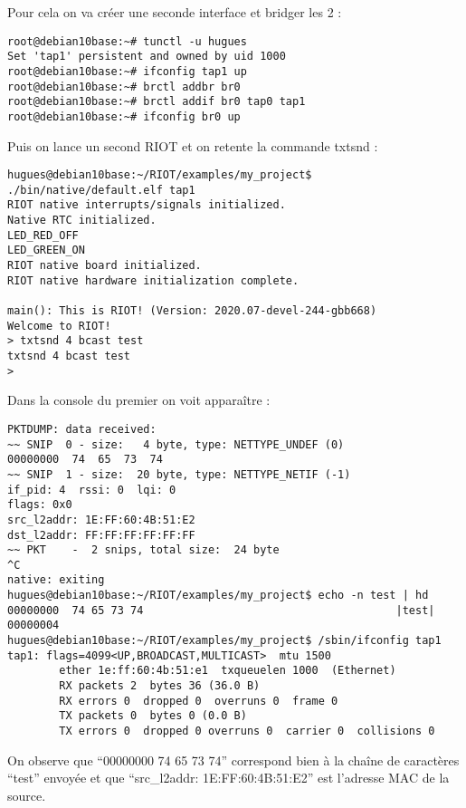 Pour cela on va créer une seconde interface et bridger les 2 :
\begin{verbatim}
root@debian10base:~# tunctl -u hugues
Set 'tap1' persistent and owned by uid 1000
root@debian10base:~# ifconfig tap1 up
root@debian10base:~# brctl addbr br0
root@debian10base:~# brctl addif br0 tap0 tap1
root@debian10base:~# ifconfig br0 up
\end{verbatim}
Puis on lance un second RIOT et on retente la commande txtsnd :
\begin{verbatim}
hugues@debian10base:~/RIOT/examples/my_project$ ./bin/native/default.elf tap1
RIOT native interrupts/signals initialized.
Native RTC initialized.
LED_RED_OFF
LED_GREEN_ON
RIOT native board initialized.
RIOT native hardware initialization complete.

main(): This is RIOT! (Version: 2020.07-devel-244-gbb668)
Welcome to RIOT!
> txtsnd 4 bcast test 
txtsnd 4 bcast test 
> 
\end{verbatim}
Dans la console du premier on voit apparaître :
\begin{verbatim}
PKTDUMP: data received:
~~ SNIP  0 - size:   4 byte, type: NETTYPE_UNDEF (0)
00000000  74  65  73  74
~~ SNIP  1 - size:  20 byte, type: NETTYPE_NETIF (-1)
if_pid: 4  rssi: 0  lqi: 0
flags: 0x0
src_l2addr: 1E:FF:60:4B:51:E2
dst_l2addr: FF:FF:FF:FF:FF:FF
~~ PKT    -  2 snips, total size:  24 byte
^C
native: exiting
hugues@debian10base:~/RIOT/examples/my_project$ echo -n test | hd
00000000  74 65 73 74                                       |test|
00000004
hugues@debian10base:~/RIOT/examples/my_project$ /sbin/ifconfig tap1
tap1: flags=4099<UP,BROADCAST,MULTICAST>  mtu 1500
        ether 1e:ff:60:4b:51:e1  txqueuelen 1000  (Ethernet)
        RX packets 2  bytes 36 (36.0 B)
        RX errors 0  dropped 0  overruns 0  frame 0
        TX packets 0  bytes 0 (0.0 B)
        TX errors 0  dropped 0 overruns 0  carrier 0  collisions 0
\end{verbatim}
On observe que \enquote{00000000  74  65  73  74} correspond bien à la chaîne de
caractères \enquote{test} envoyée et que \enquote{src\_l2addr: 1E:FF:60:4B:51:E2}
est l'adresse MAC de la source.
